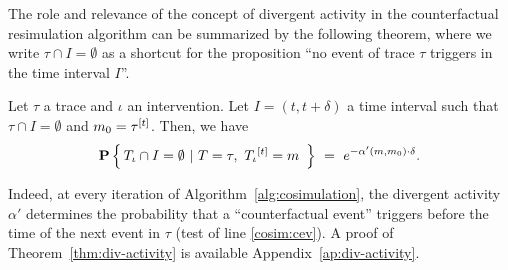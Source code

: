 

The role and relevance of the concept of divergent activity in the
counterfactual resimulation algorithm can be summarized by the
following theorem, where we write $\tau \cap I = \emptyset$ as a
shortcut for the proposition ``no event of trace $\tau$ triggers in
the time interval $I$''.
\begin{theorem}\label{thm:div-activity}
  Let $\tau$ a trace
  and $\iota$ an intervention. Let $I = (t, t+\delta)$ a time interval
  such that $\tau \cap I = \emptyset$ and $m_0 =
  \tau^{[t]}$. Then, we have
  \[\mathbf{P} \left\{\,  {T_\iota}{} \cap I = \emptyset  \ |\  T=\tau,\
      {T_\iota}{}^{[t]} = m\  \,\right\}
    \ =\ e^{-\alpha'(m, m_0) \cdot \delta}.
  \]
\end{theorem}
\noindent Indeed, at every iteration of
Algorithm~\ref{alg:cosimulation}, the divergent activity $\alpha'$
determines the probability that a ``counterfactual event'' triggers
before the time of the next event in $\tau$ (test of line
\ref{cosim:cev}).  A proof of Theorem~\ref{thm:div-activity} is
available Appendix~\ref{ap:div-activity}.

%
